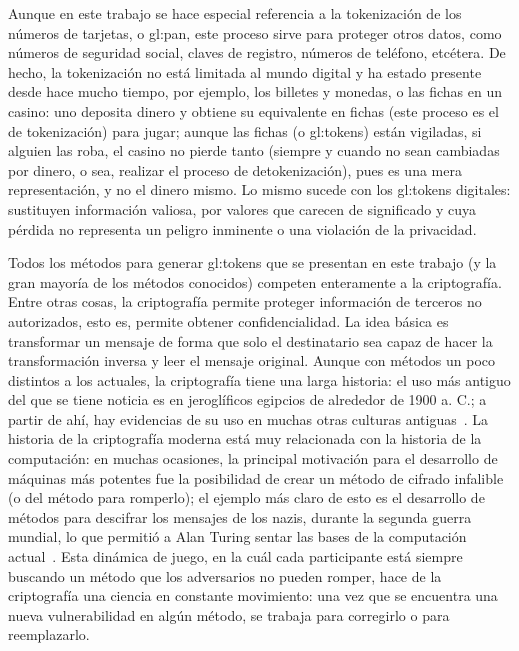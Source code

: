 
Aunque en este trabajo se hace especial referencia a la tokenización de los
números de tarjetas, o \gls{gl:pan}, este proceso sirve para proteger otros
datos, como números de seguridad social, claves de registro, números de
teléfono, etcétera. De hecho, la tokenización no está limitada al mundo digital
y ha estado presente desde hace mucho tiempo, por ejemplo, los billetes y
monedas, o las fichas en un casino: uno deposita dinero y obtiene su
equivalente en fichas (este proceso es el de tokenización) para jugar; aunque
las fichas (o \glspl{gl:token}) están vigiladas, si alguien las roba, el casino
no pierde tanto (siempre y cuando no sean cambiadas por dinero, o sea, realizar
el proceso de detokenización), pues es una mera representación, y no el dinero
mismo. Lo mismo sucede con los \glspl{gl:token} digitales: sustituyen
información valiosa, por valores que carecen de significado y cuya pérdida
no representa un peligro inminente o una violación de la privacidad.

Todos los métodos para generar \glspl{gl:token} que se presentan en este trabajo
(y la gran mayoría de los métodos conocidos) competen enteramente a la
criptografía. Entre otras cosas, la criptografía permite proteger información de
terceros no autorizados, esto es, permite obtener confidencialidad. La idea
básica es transformar un mensaje de forma que solo el destinatario sea capaz
de hacer la transformación inversa y leer el mensaje original. Aunque con
métodos un poco distintos a los actuales, la criptografía tiene una larga
historia: el uso más antiguo del que se tiene noticia es en jeroglíficos
egipcios de alrededor de 1900 a. C.; a partir de ahí, hay evidencias de su uso
en muchas otras culturas antiguas~\cite{codebreakers}. La historia de la
criptografía moderna está muy relacionada con la historia de la computación: en
muchas ocasiones, la principal motivación para el desarrollo de máquinas más
potentes fue la posibilidad de crear un método de cifrado infalible (o del
método para romperlo); el ejemplo más claro de esto es el desarrollo de
métodos para descifrar los mensajes de los nazis, durante la segunda guerra
mundial, lo que permitió a Alan Turing sentar las bases de la computación
actual~\cite{simon_singht}. Esta dinámica de juego, en la cuál cada participante
está siempre buscando un método que los adversarios no pueden romper,
hace de la criptografía una ciencia en constante movimiento: una vez que
se encuentra una nueva vulnerabilidad en algún método, se trabaja para
corregirlo o para reemplazarlo.

